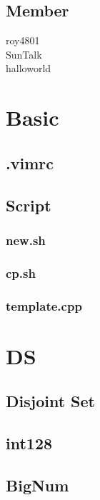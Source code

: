 
\subsection{Member}
roy4801 \\
SunTalk \\
halloworld
\section{Basic}

\subsection{.vimrc}


\subsection{Script}
\subsubsection{new.sh}


\subsubsection{cp.sh}


\subsubsection{template.cpp}


\section{DS}

\subsection{Disjoint Set}


\subsection{int128}


\subsection{BigNum}


